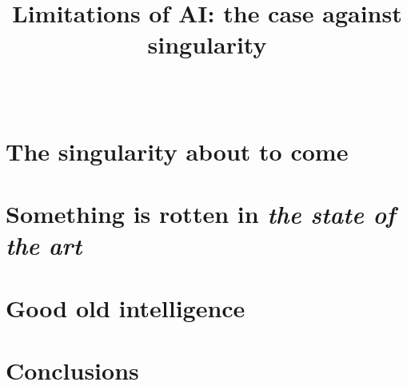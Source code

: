 \documentclass[10pt, a4paper, twocolumn]{article} %
\title{Limitations of AI: the case against singularity} %
\author{
	\authorstyle{V\'ictor Santiago Gonz\'alez} %
	\newline\newline %
	\keywords{Artificial intelligence, singularity, }\\ %
}
\date{} %
\begin{document}
\maketitle %

\thispagestyle{firstpage} %



	\section{The singularity about to come}

	


	\section{Something is rotten in \textit{the state of the art}}

	


	\section{Good old intelligence}

	


	\section{Conclusions}

	



\printbibliography[title={References}] %

\end{document}
